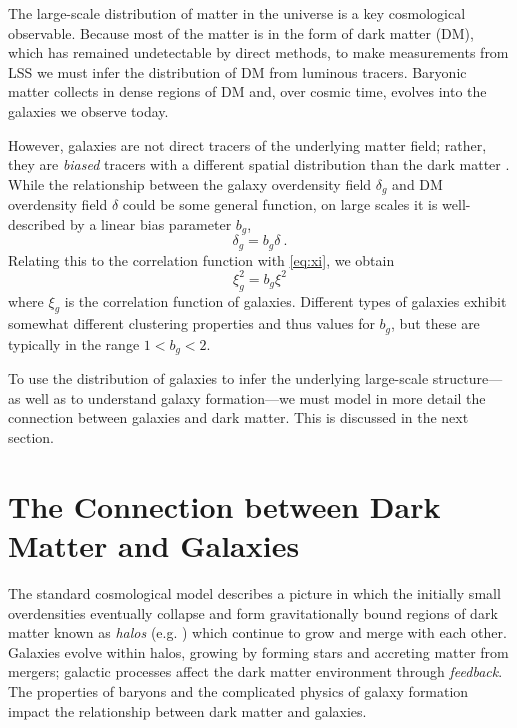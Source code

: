 
The large-scale distribution of matter in the universe is a key cosmological observable.
Because most of the matter is in the form of dark matter (DM), which has remained undetectable by direct methods, to make measurements from LSS we must infer the distribution of DM from luminous tracers.
Baryonic matter collects in dense regions of DM and, over cosmic time, evolves into the galaxies we observe today.

However, galaxies are not direct tracers of the underlying matter field; rather, they are \emph{biased} tracers with a different spatial distribution than the dark matter \citep{kaiser_spatial_1984}.
While the relationship between the galaxy overdensity field $\delta_g$ and DM overdensity field $\delta$ could be some general function, on large scales it is well-described by a linear bias parameter $b_g$,
\begin{equation}
    \delta_g = b_g \delta ~.
\end{equation}
Relating this to the correlation function with \eqref{eq:xi}, we obtain
\begin{equation}
    \xi_g^2 = b_g \xi^2
\end{equation}
where $\xi_g$ is the correlation function of galaxies.
Different types of galaxies exhibit somewhat different clustering properties and thus values for $b_g$, but these are typically in the range $1<b_g<2$.

To use the distribution of galaxies to infer the underlying large-scale structure---as well as to understand galaxy formation---we must model in more detail the connection between galaxies and dark matter.
This is discussed in the next section.


\section{The Connection between Dark Matter and Galaxies}
\label{sec:galhalo}


The standard cosmological model describes a picture in which the initially small overdensities eventually collapse and form gravitationally bound regions of dark matter known as \emph{halos} (e.g. \citealt{bryan_statistical_1998}) which continue to grow and merge with each other.
Galaxies evolve within halos, growing by forming stars and accreting matter from mergers; galactic processes affect the dark matter environment through \emph{feedback}.
The properties of baryons and the complicated physics of galaxy formation impact the relationship between dark matter and galaxies.

